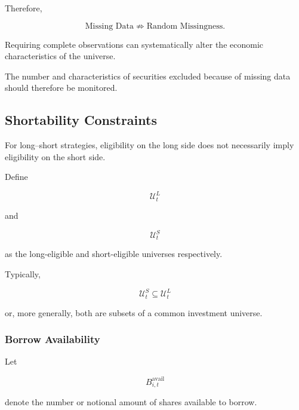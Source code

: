 \documentclass[11pt,a4paper]{article}
\begin{document}
Therefore,

\begin{equation}
\boxed{
\text{Missing Data}
\not\Rightarrow
\text{Random Missingness}.
}
\end{equation}

Requiring complete observations can systematically alter the economic
characteristics of the universe.

The number and characteristics of securities excluded because of missing data
should therefore be monitored.


\subsection{Shortability Constraints}
\label{subsec:shortability_constraints}

For long--short strategies, eligibility on the long side does not necessarily
imply eligibility on the short side.

Define

\begin{equation}
\mathcal{U}_t^{L}
\end{equation}

and

\begin{equation}
\mathcal{U}_t^{S}
\end{equation}

as the long-eligible and short-eligible universes respectively.

Typically,

\begin{equation}
\boxed{
\mathcal{U}_t^{S}
\subseteq
\mathcal{U}_t^{L}
}
\end{equation}

or, more generally, both are subsets of a common investment universe.


\subsubsection{Borrow Availability}

Let

\begin{equation}
B_{i,t}^{\mathrm{avail}}
\end{equation}

denote the number or notional amount of shares available to borrow.
\end{document}
